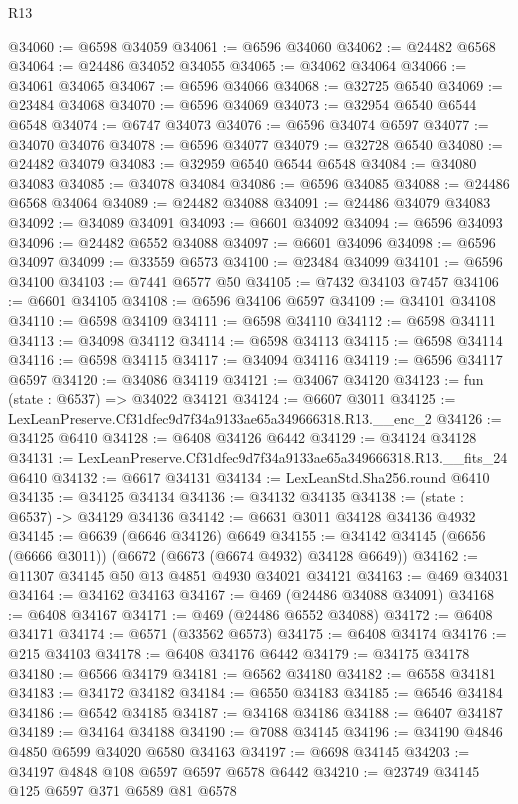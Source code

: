 \begin{lexlean}{R13}
\begin{coremodule}
@34060 := @6598 @34059
@34061 := @6596 @34060
@34062 := @24482 @6568
@34064 := @24486 @34052 @34055
@34065 := @34062 @34064
@34066 := @34061 @34065
@34067 := @6596 @34066
@34068 := @32725 @6540
@34069 := @23484 @34068
@34070 := @6596 @34069
@34073 := @32954 @6540 @6544 @6548
@34074 := @6747 @34073
@34076 := @6596 @34074 @6597
@34077 := @34070 @34076
@34078 := @6596 @34077
@34079 := @32728 @6540
@34080 := @24482 @34079
@34083 := @32959 @6540 @6544 @6548
@34084 := @34080 @34083
@34085 := @34078 @34084
@34086 := @6596 @34085
@34088 := @24486 @6568 @34064
@34089 := @24482 @34088
@34091 := @24486 @34079 @34083
@34092 := @34089 @34091
@34093 := @6601 @34092
@34094 := @6596 @34093
@34096 := @24482 @6552 @34088
@34097 := @6601 @34096
@34098 := @6596 @34097
@34099 := @33559 @6573
@34100 := @23484 @34099
@34101 := @6596 @34100
@34103 := @7441 @6577 @50
@34105 := @7432 @34103 @7457
@34106 := @6601 @34105
@34108 := @6596 @34106 @6597
@34109 := @34101 @34108
@34110 := @6598 @34109
@34111 := @6598 @34110
@34112 := @6598 @34111
@34113 := @34098 @34112
@34114 := @6598 @34113
@34115 := @6598 @34114
@34116 := @6598 @34115
@34117 := @34094 @34116
@34119 := @6596 @34117 @6597
@34120 := @34086 @34119
@34121 := @34067 @34120
@34123 := fun (state : @6537) => @34022 @34121
@34124 := @6607 @3011
@34125 := LexLeanPreserve.Cf31dfec9d7f34a9133ae65a349666318.R13.__enc_2
@34126 := @34125 @6410
@34128 := @6408 @34126 @6442
@34129 := @34124 @34128
@34131 := LexLeanPreserve.Cf31dfec9d7f34a9133ae65a349666318.R13.__fits_24 @6410
@34132 := @6617 @34131
@34134 := LexLeanStd.Sha256.round @6410
@34135 := @34125 @34134
@34136 := @34132 @34135
@34138 := (state : @6537) -> @34129 @34136
@34142 := @6631 @3011 @34128 @34136 @4932
@34145 := @6639 (@6646 @34126) @6649
@34155 := @34142 @34145 (@6656 (@6666 @3011)) (@6672 (@6673 (@6674 @4932) @34128 @6649))
@34162 := @11307 @34145 @50 @13 @4851 @4930 @34021 @34121
@34163 := @469 @34031
@34164 := @34162 @34163
@34167 := @469 (@24486 @34088 @34091)
@34168 := @6408 @34167
@34171 := @469 (@24486 @6552 @34088)
@34172 := @6408 @34171
@34174 := @6571 (@33562 @6573)
@34175 := @6408 @34174
@34176 := @215 @34103
@34178 := @6408 @34176 @6442
@34179 := @34175 @34178
@34180 := @6566 @34179
@34181 := @6562 @34180
@34182 := @6558 @34181
@34183 := @34172 @34182
@34184 := @6550 @34183
@34185 := @6546 @34184
@34186 := @6542 @34185
@34187 := @34168 @34186
@34188 := @6407 @34187
@34189 := @34164 @34188
@34190 := @7088 @34145
@34196 := @34190 @4846 @4850 @6599 @34020 @6580 @34163
@34197 := @6698 @34145
@34203 := @34197 @4848 @108 @6597 @6597 @6578 @6442
@34210 := @23749 @34145 @125 @6597 @371 @6589 @81 @6578

\end{coremodule}
\end{lexlean}
